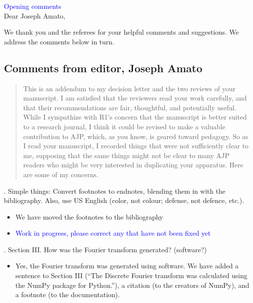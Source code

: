 \documentclass{article}
\newcommand{\todo}{\textcolor{blue}}
\begin{document}
\todo{Opening comments}\\


Dear Joseph Amato, 

We thank you and the referees for your helpful comments and suggestions. 
We address the comments below in turn. 

\subsection*{Comments from editor, Joseph Amato}
\begin{quote}
This is an addendum to my decision letter and the two reviews of your manuscript.  I am satisfied that the reviewers read your work carefully, and that their recommendations are fair, thoughtful, and potentially useful.  While I sympathize with R1’s concern that the manuscript is better suited to a research journal, I think it could be revised to make a valuable contribution to AJP, which, as you know, is geared toward pedagogy.  So as I read your manuscript, I recorded things that were not sufficiently clear to me, supposing that the same things might not be clear to many AJP readers who might be very interested in duplicating your apparatus.  Here are some of my concerns.
\end{quote}

. Simple things: Convert footnotes to endnotes, blending them in with the bibliography.  Also, use US English (color, not colour; defense, not defence, etc.). 
\begin{itemize}
\item We have moved the footnotes to the bibliography
\item \todo{Work in progress, please correct any that have not been fixed yet}
\end{itemize}

. Section III.  How was the Fourier transform generated?  (software?)
\begin{itemize}
\item Yes, the Fourier transform was generated using software. We have added a sentence to Section III (``The Discrete Fourier transform was calculated using the NumPy package for Python.''), a citation (to the creators of NumPy), and a footnote (to the documentation).
\end{itemize}
\end{document}
